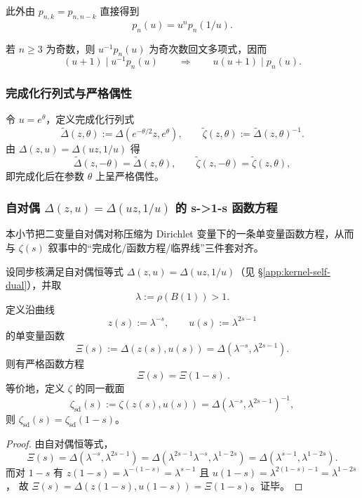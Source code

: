 此外由 $p_{n,k}=p_{n,n-k}$ 直接得到
\[
p_n(u)=u^n p_n(1/u).
\]

\begin{corollary}\label{cor:primitive-odd-div}
若 $n\ge 3$ 为奇数，则 $u^{-1}p_n(u)$ 为奇次数回文多项式，因而
\[
(u+1)\mid u^{-1}p_n(u)\qquad\Longrightarrow\qquad u(u+1)\mid p_n(u).
\]
\end{corollary}

\subsubsection{完成化行列式与严格偶性}\label{app:kernel-completion}
令 $u=e^\theta$，定义完成化行列式
\[
\widetilde{\Delta}(z,\theta):=\Delta(e^{-\theta/2}z,e^\theta),
\qquad
\widetilde{\zeta}(z,\theta):=\widetilde{\Delta}(z,\theta)^{-1}.
\]
由 $\Delta(z,u)=\Delta(uz,1/u)$ 得
\[
\widetilde{\Delta}(z,-\theta)=\widetilde{\Delta}(z,\theta),
\qquad
\widetilde{\zeta}(z,-\theta)=\widetilde{\zeta}(z,\theta),
\]
即完成化后在参数 $\theta$ 上呈严格偶性。

\subsubsection{自对偶 \texorpdfstring{$\Delta(z,u)=\Delta(uz,1/u)$}{Delta(z,u)=Delta(uz,1/u)} 的 s->1-s 函数方程}\label{app:kernel-functional-equation}
本小节把二变量自对偶对称压缩为 Dirichlet 变量下的一条单变量函数方程，从而与 $\zeta(s)$ 叙事中的“完成化/函数方程/临界线”三件套对齐。

\begin{proposition}[完成化行列式的函数方程]\label{prop:kernel-xi-functional-equation}
设同步核满足自对偶恒等式 $\Delta(z,u)=\Delta(uz,1/u)$（见 \S\ref{app:kernel-self-dual}），并取
\[
\lambda:=\rho(B(1))>1.
\]
定义沿曲线
\[
z(s):=\lambda^{-s},\qquad u(s):=\lambda^{2s-1}
\]
的单变量函数
\[
\Xi(s):=\Delta(z(s),u(s))=\Delta(\lambda^{-s},\lambda^{2s-1}).
\]
则有严格函数方程
\[
\boxed{\ \Xi(s)=\Xi(1-s)\ }.
\]
等价地，定义 $\zeta$ 的同一截面
\[
\zeta_{\mathrm{sd}}(s):=\zeta(z(s),u(s))=\Delta(\lambda^{-s},\lambda^{2s-1})^{-1},
\]
则 $\zeta_{\mathrm{sd}}(s)=\zeta_{\mathrm{sd}}(1-s)$。
\end{proposition}
\begin{proof}
由自对偶恒等式，
\[
\Xi(s)=\Delta(\lambda^{-s},\lambda^{2s-1})
=\Delta(\lambda^{2s-1}\lambda^{-s},\lambda^{1-2s})
=\Delta(\lambda^{s-1},\lambda^{1-2s}).
\]
而对 $1-s$ 有
\(
z(1-s)=\lambda^{-(1-s)}=\lambda^{s-1}
\)
且
\(
u(1-s)=\lambda^{2(1-s)-1}=\lambda^{1-2s}
\)，
故 $\Xi(s)=\Delta(z(1-s),u(1-s))=\Xi(1-s)$。证毕。
\end{proof}

